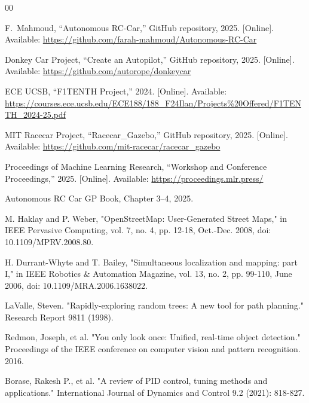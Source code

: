 \documentclass[journal,transmag]{IEEEtran}
\begin{document}
\begin{thebibliography}{00}

F.~Mahmoud, ``Autonomous RC-Car,'' GitHub repository, 2025. [Online]. Available: \url{https://github.com/farah-mahmoud/Autonomous-RC-Car}

Donkey Car Project, ``Create an Autopilot,'' GitHub repository, 2025. [Online]. Available: \url{https://github.com/autorope/donkeycar}

ECE UCSB, ``F1TENTH Project,'' 2024. [Online]. Available: \url{https://courses.ece.ucsb.edu/ECE188/188_F24Ilan/Projects%20Offered/F1TENTH_2024-25.pdf}

MIT Racecar Project, ``Racecar\_Gazebo,'' GitHub repository, 2025. [Online]. Available: \url{https://github.com/mit-racecar/racecar_gazebo}

Proceedings of Machine Learning Research, ``Workshop and Conference Proceedings,'' 2025. [Online]. Available: \url{https://proceedings.mlr.press/}

Autonomous RC Car GP Book, Chapter 3--4, 2025.

M. Haklay and P. Weber, "OpenStreetMap: User-Generated Street Maps," in IEEE Pervasive Computing, vol. 7, no. 4, pp. 12-18, Oct.-Dec. 2008, doi: 10.1109/MPRV.2008.80.

H. Durrant-Whyte and T. Bailey, "Simultaneous localization and mapping: part I," in IEEE Robotics \& Automation Magazine, vol. 13, no. 2, pp. 99-110, June 2006, doi: 10.1109/MRA.2006.1638022.

LaValle, Steven. "Rapidly-exploring random trees: A new tool for path planning." Research Report 9811 (1998).

Redmon, Joseph, et al. "You only look once: Unified, real-time object detection." Proceedings of the IEEE conference on computer vision and pattern recognition. 2016.

Borase, Rakesh P., et al. "A review of PID control, tuning methods and applications." International Journal of Dynamics and Control 9.2 (2021): 818-827.





\end{thebibliography}
\end{document}
